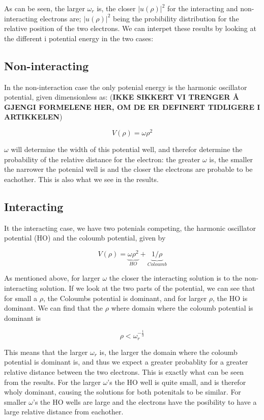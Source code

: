 \documentclass[a4paper, 10pt]{article}
\begin{document}
As can be seen, the larger $\omega_r$ is, the closer $|u(\rho)|^{2}$ for the interacting and non-interacting electrons are; $|u(\rho)|^{2}$ being the probibility distribution for the relative position of the two electrons. We can interpet these results by looking at the different i potential energy in the two cases:

\subsection{Non-interacting}

In the non-interaction case the only potenial energy is the harmonic oscillator potential, given dimensionless as: (\textbf{IKKE SIKKERT VI TRENGER Å GJENGI FORMELENE HER, OM DE ER DEFINERT TIDLIGERE I ARTIKKELEN})

$$
V(\rho) = \omega\rho^{2} 
$$

$\omega$ will determine the width of this potential well, and therefor determine the probability of the relative distance for the electron: the greater $\omega$ is, the smaller the narrower the potenial well is and the closer the electrons are probable to be eachother. This is also what we see in the results.

\subsection{Interacting}

It the interacting case, we have two potenials competing, the harmonic oscillator potential (HO) and the coloumb potential, given by

$$
V(\rho) = \underbrace{\omega\rho^{2} }_{HO} + \underbrace{1/\rho}_{Coloumb}
$$

As mentioned above, for larger $\omega$ the closer the interacting solution is to the non-interacting solution. If we look at the two parts of the potential, we can see that for small a $\rho$, the Coloumbs potential is dominant, and for larger $\rho$, the HO is dominant. We can find that the $\rho$ where domain where the coloumb potential is dominant is

$$
\rho < \omega_r^{-\frac{1}{3}}
$$ 

This means that the larger $\omega_r$ is, the larger the domain where the coloumb potential is dominant is, and thus we expect a greater probablity for a greater relative distance between the two electrons. This is exactly what can be seen from the results. For the larger $\omega$'s the HO well is quite small, and is therefor wholy dominant, causing the solutions for both potenitals to be similar. For smaller $\omega$'s the HO wells are large and the electrons have the posibility to have a large relative distance from eachother.
\end{document}
